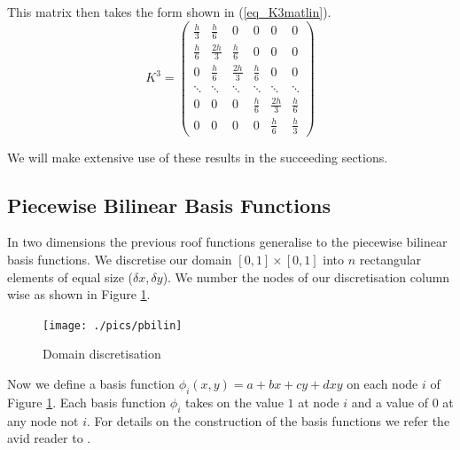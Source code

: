 \documentclass[11pt,fleqn]{article}
\theoremstyle{defstyle}
\begin{document}
This matrix then takes the form shown in (\ref{eq_K3matlin}).
\begin{equation}
K^3 = \begin{pmatrix}
\frac{h}{3} & \frac{h}{6} &0& 0 & 0 &  0\\
\frac{h}{6} & \frac{2h}{3} & \frac{h}{6} & 0 & 0 &  0\\
0 & \frac{h}{6} & \frac{2h}{3} & \frac{h}{6} & 0 & 0  \\
\ddots & \ddots & \ddots & \ddots & \ddots & \ddots \\
0 & 0 & 0  & \frac{h}{6}& \frac{2h}{3} & \frac{h}{6} \\
0 & 0 & 0 & 0 &\frac{h}{6} & \frac{h}{3}   
\end{pmatrix}
\label{eq_K3matlin}
\end{equation} 

We will make extensive use of these results in the succeeding sections.
\subsection{Piecewise Bilinear Basis Functions}
\label{section_pbbf}
In two dimensions the previous roof functions generalise to the piecewise bilinear basis functions. We discretise our domain $[0,1] \times [0,1]$ into $n$ rectangular elements of equal size ($\delta x, \delta y$). We number the nodes of our discretisation column wise as shown in Figure \ref{fig_pbilindomain}.
\begin{figure}[H] 
\centering
\texttt{[image: ./pics/pbilin]}
\caption{Domain discretisation} 
\label{fig_pbilindomain}
\end{figure}
Now we define a basis function $\phi_i(x,y) = a+ bx +cy +dxy$ on each node $i$ of Figure \ref{fig_pbilindomain}. Each basis function $\phi_i$ takes on the value $1$ at node $i$ and a value of $0$ at any node not $i$. For details on the construction of the basis functions we refer the avid reader to \cite{vrb}. 
\end{document}
